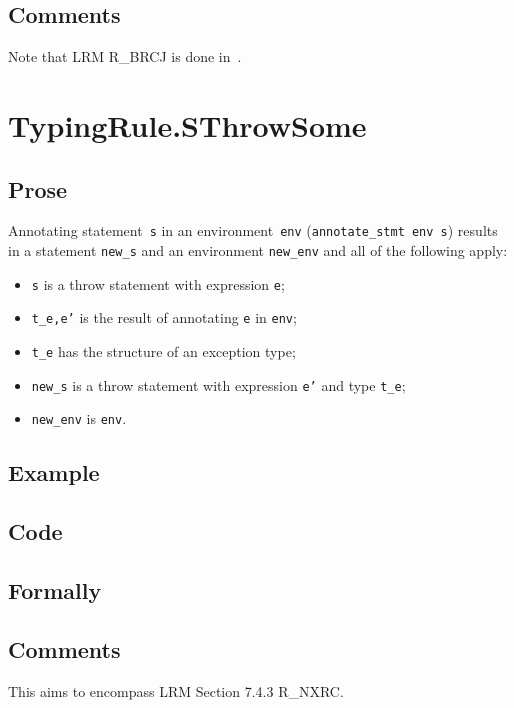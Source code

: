 \documentclass{book}
\begin{document}
\subsection{Comments}
  Note that LRM R\_BRCJ is done in~\cite[SemanticsRule.TopLevel]{ASLSemanticsReference}.

\section{TypingRule.SThrowSome \label{sec:TypingRule.SThrowSome}}

  \subsection{Prose}
Annotating statement~\texttt{s} in an environment~\texttt{env}
(\texttt{annotate\_stmt env s}) results in a statement \texttt{new\_s} and an
environment \texttt{new\_env} and all of the following apply:
   \begin{itemize}
   \item \texttt{s} is a throw statement with expression \texttt{e};
   \item \texttt{t\_e,e'} is the result of annotating \texttt{e} in \texttt{env};
   \item \texttt{t\_e} has the structure of an exception type;
   \item \texttt{new\_s} is a throw statement with expression \texttt{e'} and type \texttt{t\_e};
   \item \texttt{new\_env} is \texttt{env}.
   \end{itemize}

  \subsection{Example}

  \subsection{Code}

\begin{emptyformal}
    \subsection{Formally}
\end{emptyformal}

\subsection{Comments}
    This aims to encompass LRM Section 7.4.3 R\_NXRC.
\end{document}
